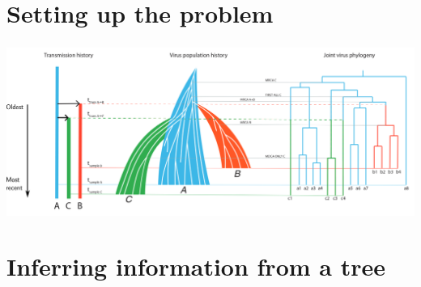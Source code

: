 \documentclass[aspectratio=169]{beamer}
\begin{document}
\section{Setting up the problem}

\begin{frame} \frametitle{\insertsection}
    \begin{center}
        \centering\includegraphics[width=\textwidth]{images/thomas-figure}
    \end{center}
\end{frame}

\section{Inferring information from a tree}
\end{document}
